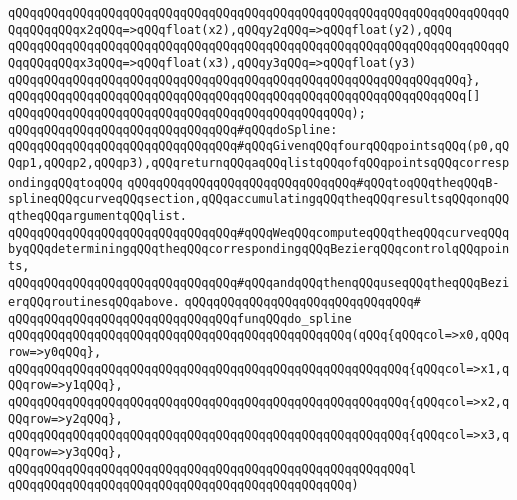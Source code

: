 \verb|qQQqqQQqqQQqqQQqqQQqqQQqqQQqqQQqqQQqqQQqqQQqqQQqqQQqqQQqqQQqqQQqqQQqqQQqqQQqqQQqx2qQQq=>qQQqfloat(x2),qQQqy2qQQq=>qQQqfloat(y2),qQQq|\newline
\verb|qQQqqQQqqQQqqQQqqQQqqQQqqQQqqQQqqQQqqQQqqQQqqQQqqQQqqQQqqQQqqQQqqQQqqQQqqQQqqQQqx3qQQq=>qQQqfloat(x3),qQQqy3qQQq=>qQQqfloat(y3)|\newline
\verb|qQQqqQQqqQQqqQQqqQQqqQQqqQQqqQQqqQQqqQQqqQQqqQQqqQQqqQQqqQQqqQQq},|\newline
\verb|qQQqqQQqqQQqqQQqqQQqqQQqqQQqqQQqqQQqqQQqqQQqqQQqqQQqqQQqqQQqqQQq[]|\newline
\verb|qQQqqQQqqQQqqQQqqQQqqQQqqQQqqQQqqQQqqQQqqQQqqQQq);|\newline
\newline
\verb|qQQqqQQqqQQqqQQqqQQqqQQqqQQqqQQq#qQQqdoSpline:|\newline
\verb|qQQqqQQqqQQqqQQqqQQqqQQqqQQqqQQq#qQQqGivenqQQqfourqQQqpointsqQQq(p0,qQQqp1,qQQqp2,qQQqp3),qQQqreturnqQQqaqQQqlistqQQqofqQQqpointsqQQqcorrespondingqQQqtoqQQq|\newline
\verb|qQQqqQQqqQQqqQQqqQQqqQQqqQQqqQQq#qQQqtoqQQqtheqQQqB-splineqQQqcurveqQQqsection,qQQqaccumulatingqQQqtheqQQqresultsqQQqonqQQqtheqQQqargumentqQQqlist.|\newline
\verb|qQQqqQQqqQQqqQQqqQQqqQQqqQQqqQQq#qQQqWeqQQqcomputeqQQqtheqQQqcurveqQQqbyqQQqdeterminingqQQqtheqQQqcorrespondingqQQqBezierqQQqcontrolqQQqpoints,|\newline
\verb|qQQqqQQqqQQqqQQqqQQqqQQqqQQqqQQq#qQQqandqQQqthenqQQquseqQQqtheqQQqBezierqQQqroutinesqQQqabove.|\newline
\verb|qQQqqQQqqQQqqQQqqQQqqQQqqQQqqQQq#|\newline
\verb|qQQqqQQqqQQqqQQqqQQqqQQqqQQqqQQqfunqQQqdo_spline|\newline
\verb|qQQqqQQqqQQqqQQqqQQqqQQqqQQqqQQqqQQqqQQqqQQqqQQq(qQQq{qQQqcol=>x0,qQQqrow=>y0qQQq},|\newline
\verb|qQQqqQQqqQQqqQQqqQQqqQQqqQQqqQQqqQQqqQQqqQQqqQQqqQQqqQQq{qQQqcol=>x1,qQQqrow=>y1qQQq},|\newline
\verb|qQQqqQQqqQQqqQQqqQQqqQQqqQQqqQQqqQQqqQQqqQQqqQQqqQQqqQQq{qQQqcol=>x2,qQQqrow=>y2qQQq},|\newline
\verb|qQQqqQQqqQQqqQQqqQQqqQQqqQQqqQQqqQQqqQQqqQQqqQQqqQQqqQQq{qQQqcol=>x3,qQQqrow=>y3qQQq},|\newline
\verb|qQQqqQQqqQQqqQQqqQQqqQQqqQQqqQQqqQQqqQQqqQQqqQQqqQQqqQQql|\newline
\verb|qQQqqQQqqQQqqQQqqQQqqQQqqQQqqQQqqQQqqQQqqQQqqQQq)|\newline
